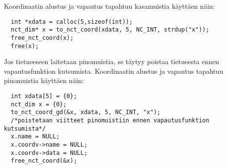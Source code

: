 \documentclass{scrartcl}
\begin{document}
Koordinaatin alustus ja vapautus tapahtuu kasamuistia käyttäen näin:
\begin{verbatim}
  int *xdata = calloc(5,sizeof(int));
  nct_dim* x = to_nct_coord(xdata, 5, NC_INT, strdup("x"));
  free_nct_coord(x);
  free(x);
\end{verbatim}
Jos tietueeseen laitetaan pinomuistia, se täytyy poistaa tietueesta ennen vapautusfunktion kutsumista.
Koordinaatin alustus ja vapautus tapahtuu pinomuistia käyttäen näin:
\begin{verbatim}
  int xdata[5] = {0};
  nct_dim x = {0};
  to_nct_coord_gd(&x, xdata, 5, NC_INT, "x");
  /*poistetaan viitteet pinomuistiin ennen vapautusfunktion kutsumista*/
  x.name = NULL;
  x.coordv->name = NULL;
  x.coordv->data = NULL;
  free_nct_coord(&x);
\end{verbatim}
\end{document}
